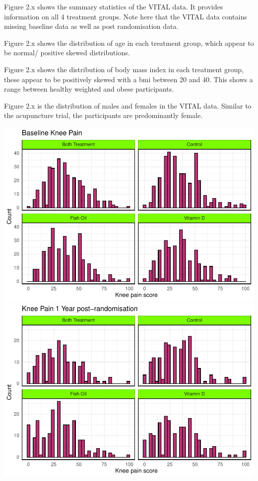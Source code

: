 \documentclass{article}
\newcommand{\pandocbounded}[1]{#1}
\begin{document}
Figure 2.x shows the summary statistics of the VITAL data. It provides
information on all 4 treatment groups. Note here that the VITAL data
contains missing baseline data as well as post randomisation data.

Figure 2.x shows the distribution of age in each treatment group, which
appear to be normal/ positive skewed distributions.

Figure 2.x shows the distribution of body mass index in each treatment
group, these appear to be positively skewed with a bmi between 20 and
40. This shows a range between healthy weighted and obese participants.

Figure 2.x is the distribution of males and females in the VITAL data.
Similar to the acupuncture trial, the participants are predominantly
female.

\pandocbounded{\includegraphics[keepaspectratio]{Final_Report_files/figure-latex/unnamed-chunk-7-1.pdf}}
\pandocbounded{\includegraphics[keepaspectratio]{Final_Report_files/figure-latex/unnamed-chunk-7-2.pdf}}
\end{document}
